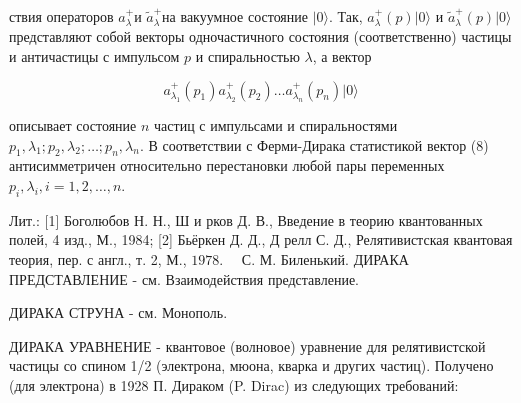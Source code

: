 \documentclass[10pt]{article}
\begin{document}
ствия операторов $a_{\lambda}^{+}$и $\tilde{a}_{\lambda}^{+}$на вакуумное состояние $|0\rangle$. Так, $a_{\lambda}^{+}(p)|0\rangle$ и $\tilde{a}_{\lambda}^{+}(p)|0\rangle$ представляют собой векторы одночастичного состояния (соответственно) частицы и античастицы с импульсом $p$ и спиральностью $\lambda$, а вектор



\[

a_{\lambda_{1}}^{+}\left(p_{1}\right) a_{\lambda_{2}}^{+}\left(p_{2}\right) \ldots a_{\lambda_{n}}^{+}\left(p_{n}\right)|0\rangle

\]



описывает состояние $n$ частиц с импульсами и спиральностями $p_{1}, \lambda_{1} ; p_{2}, \lambda_{2} ; \ldots ; p_{n}, \lambda_{n}$. В соответствии с Ферми-Дирака статистикой вектор (8) антисимметричен относительно перестановки любой пары переменных $p_{i}, \lambda_{i}, i=1,2, \ldots, n$.



Лит.: [1] Боголюбов Н. Н., Ш и рков Д. В., Введение в теорию квантованных полей, 4 изд., М., 1984; [2] Бьёркен Д. Д., Д релл С. Д., Релятивистская квантовая теория, пер. с англ., т. 2, М., $1978 . \quad$ С. М. Биленький. ДИРАКА ПРЕДСТАВЛЕНИЕ - см. Взаимодействия представление.



ДИРАКА СТРУНА - см. Монополь.



ДИРАКА УРАВНЕНИЕ - квантовое (волновое) уравнение для релятивистской частицы со спином 1/2 (электрона, мюона, кварка и других частиц). Получено (для электрона) в 1928 П. Дираком (P. Dirac) из следующих требований:
\end{document}
